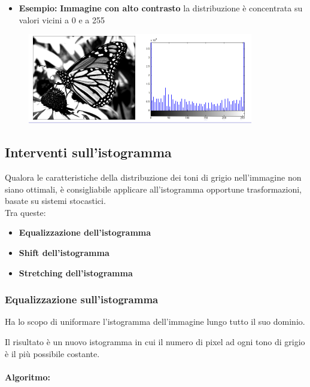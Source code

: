 \begin{itemize}
    \item \textbf{Esempio:} \textbf{Immagine con alto contrasto}
          la distribuzione è concentrata su valori vicini a 0 e a 255
\end{itemize}

\begin{figure}[H]
    \centering
    \includegraphics[width=\linewidth, keepaspectratio]{capitoli/immagini/imgs/alto-c.png}
\end{figure}

\subsection{Interventi sull'istogramma}
Qualora le caratteristiche della distribuzione dei toni di grigio nell'immagine non siano ottimali, è consigliabile applicare
all'istogramma opportune trasformazioni, basate su sistemi stocastici.
\\Tra queste:

\begin{itemize}
    \item \textbf{Equalizzazione dell'istogramma}
    \item \textbf{Shift dell'istogramma}
    \item \textbf{Stretching dell'istogramma}
\end{itemize}

\subsubsection{Equalizzazione sull'istogramma}
\begin{definition}
    Ha lo scopo di uniformare l'istogramma dell'immagine lungo tutto il suo dominio.
\end{definition}
Il risultato è un nuovo istogramma in cui il numero di pixel ad ogni tono di grigio è il più possibile costante.
\\\\
\textbf{Algoritmo:}

